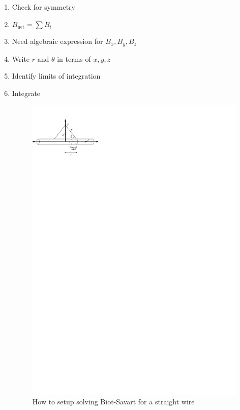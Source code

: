 \documentclass{article}
\begin{document}
\begin{itemize}
\begin{itemize}
\begin{enumerate}
              \item Check for symmetry
              \item $B_{\mathrm{net}}=\sum B_i$
              \item Need algebraic expression for $B_x, B_y, B_z$
              \item Write $r$ and $\theta$ in terms of $x,y,z$
              \item Identify limits of integration
              \item Integrate
                \begin{figure}[H]
                  \centering
                  \includegraphics{figures/solving-biot-savart.pdf}
                  \caption{How to setup solving Biot-Savart for a straight wire}
                \end{figure}
                \begin{figure}[H]

\end{figure}
\end{enumerate}
\end{itemize}
\end{itemize}
\end{document}
